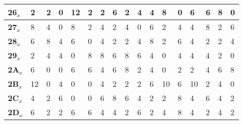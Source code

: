 \begin{longtable}[c]{|l|l|l|l|l|l|l|l|l|l|l|l|l|l|l|l|l|}
\textbf{26$_x$} & 2              & 2              & 0              & 12             & 2              & 2              & 6              & 2              & 4              & 4              & 8              & 0              & 6              & 6              & 8              & 0              \\ \hline
\textbf{27$_x$} & 8              & 4              & 0              & 8              & 2              & 4              & 2              & 4              & 0              & 6              & 2              & 4              & 4              & 8              & 2              & 6              \\ \hline
\textbf{28$_x$} & 6              & 8              & 4              & 6              & 0              & 4              & 2              & 2              & 4              & 8              & 2              & 6              & 4              & 2              & 2              & 4              \\ \hline
\textbf{29$_x$} & 2              & 4              & 4              & 0              & 8              & 8              & 6              & 8              & 6              & 4              & 0              & 4              & 4              & 4              & 2              & 0              \\ \hline
\textbf{2A$_x$} & 6              & 0              & 0              & 6              & 6              & 4              & 6              & 8              & 2              & 4              & 0              & 2              & 2              & 4              & 6              & 8              \\ \hline
\textbf{2B$_x$} & 12             & 0              & 4              & 0              & 0              & 4              & 2              & 2              & 2              & 6              & 10             & 6              & 10             & 2              & 4              & 0              \\ \hline
\textbf{2C$_x$} & 4              & 2              & 6              & 0              & 0              & 6              & 8              & 6              & 4              & 2              & 2              & 8              & 4              & 6              & 4              & 2              \\ \hline
\textbf{2D$_x$} & 6              & 2              & 2              & 6              & 6              & 4              & 4              & 2              & 6              & 2              & 4              & 8              & 4              & 2              & 4              & 2              \\ \hline

\end{longtable}
